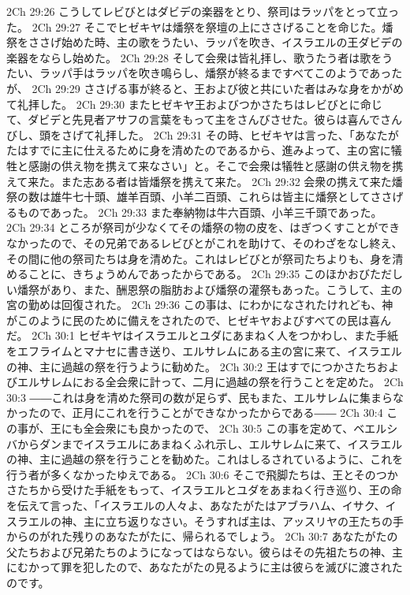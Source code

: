 2Ch 29:26  こうしてレビびとはダビデの楽器をとり、祭司はラッパをとって立った。
2Ch 29:27  そこでヒゼキヤは燔祭を祭壇の上にささげることを命じた。燔祭をささげ始めた時、主の歌をうたい、ラッパを吹き、イスラエルの王ダビデの楽器をならし始めた。
2Ch 29:28  そして会衆は皆礼拝し、歌うたう者は歌をうたい、ラッパ手はラッパを吹き鳴らし、燔祭が終るまですべてこのようであったが、
2Ch 29:29  ささげる事が終ると、王および彼と共にいた者はみな身をかがめて礼拝した。
2Ch 29:30  またヒゼキヤ王およびつかさたちはレビびとに命じて、ダビデと先見者アサフの言葉をもって主をさんびさせた。彼らは喜んでさんびし、頭をさげて礼拝した。
2Ch 29:31  その時、ヒゼキヤは言った、「あなたがたはすでに主に仕えるために身を清めたのであるから、進みよって、主の宮に犠牲と感謝の供え物を携えて来なさい」と。そこで会衆は犠牲と感謝の供え物を携えて来た。また志ある者は皆燔祭を携えて来た。
2Ch 29:32  会衆の携えて来た燔祭の数は雄牛七十頭、雄羊百頭、小羊二百頭、これらは皆主に燔祭としてささげるものであった。
2Ch 29:33  また奉納物は牛六百頭、小羊三千頭であった。
2Ch 29:34  ところが祭司が少なくてその燔祭の物の皮を、はぎつくすことができなかったので、その兄弟であるレビびとがこれを助けて、そのわざをなし終え、その間に他の祭司たちは身を清めた。これはレビびとが祭司たちよりも、身を清めることに、きちょうめんであったからである。
2Ch 29:35  このほかおびただしい燔祭があり、また、酬恩祭の脂肪および燔祭の灌祭もあった。こうして、主の宮の勤めは回復された。
2Ch 29:36  この事は、にわかになされたけれども、神がこのように民のために備えをされたので、ヒゼキヤおよびすべての民は喜んだ。
2Ch 30:1  ヒゼキヤはイスラエルとユダにあまねく人をつかわし、また手紙をエフライムとマナセに書き送り、エルサレムにある主の宮に来て、イスラエルの神、主に過越の祭を行うように勧めた。
2Ch 30:2  王はすでにつかさたちおよびエルサレムにおる全会衆に計って、二月に過越の祭を行うことを定めた。
2Ch 30:3  ――これは身を清めた祭司の数が足らず、民もまた、エルサレムに集まらなかったので、正月にこれを行うことができなかったからである――
2Ch 30:4  この事が、王にも全会衆にも良かったので、
2Ch 30:5  この事を定めて、ベエルシバからダンまでイスラエルにあまねくふれ示し、エルサレムに来て、イスラエルの神、主に過越の祭を行うことを勧めた。これはしるされているように、これを行う者が多くなかったゆえである。
2Ch 30:6  そこで飛脚たちは、王とそのつかさたちから受けた手紙をもって、イスラエルとユダをあまねく行き巡り、王の命を伝えて言った、「イスラエルの人々よ、あなたがたはアブラハム、イサク、イスラエルの神、主に立ち返りなさい。そうすれば主は、アッスリヤの王たちの手からのがれた残りのあなたがたに、帰られるでしょう。
2Ch 30:7  あなたがたの父たちおよび兄弟たちのようになってはならない。彼らはその先祖たちの神、主にむかって罪を犯したので、あなたがたの見るように主は彼らを滅びに渡されたのです。
